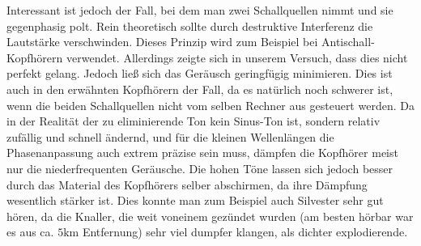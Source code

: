 \documentclass[12pt,a4paper,titlepage,headinclude,bibtotoc]{scrartcl}
\begin{document}
Interessant ist jedoch der Fall, bei dem man zwei Schallquellen nimmt und sie gegenphasig polt.
Rein theoretisch sollte durch destruktive Interferenz die Lautstärke verschwinden.
Dieses Prinzip wird zum Beispiel bei Antischall-Kopfhörern verwendet.
Allerdings zeigte sich in unserem Versuch, dass dies nicht perfekt gelang.
Jedoch ließ sich das Geräusch geringfügig minimieren.
Dies ist auch in den erwähnten Kopfhörern der Fall, da es natürlich noch schwerer ist, wenn die beiden Schallquellen nicht vom selben Rechner aus gesteuert werden.
Da in der Realität der zu eliminierende Ton kein Sinus-Ton ist, sondern relativ zufällig und schnell ändernd, und für die kleinen Wellenlängen die Phasenanpassung auch extrem präzise sein muss, dämpfen die Kopfhörer meist nur die niederfrequenten Geräusche.
Die hohen Töne lassen sich jedoch besser durch das Material des Kopfhörers selber abschirmen, da ihre Dämpfung wesentlich stärker ist.
Dies konnte man zum Beispiel auch Silvester sehr gut hören, da die Knaller, die weit voneinem gezündet wurden (am besten hörbar war es aus ca. $5\si{\kilo\meter}$ Entfernung) sehr viel dumpfer klangen, als dichter explodierende.







\end{document}
